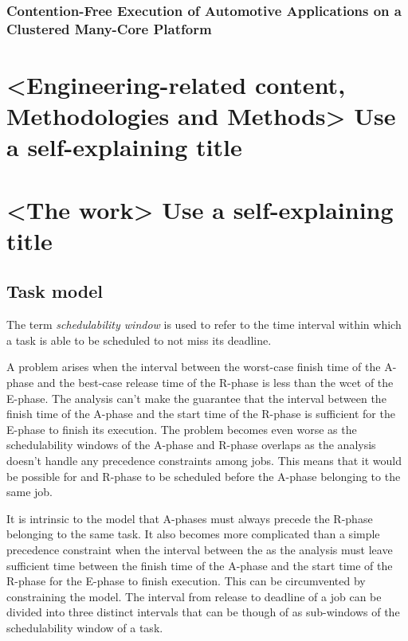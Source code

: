 \documentclass{kththesis}
\begin{document}
\subsection{Contention-Free Execution of Automotive Applications on a Clustered Many-Core Platform}



\chapter{<Engineering-related content, Methodologies and Methods> Use a self-explaining title}


\chapter{<The work> Use a self-explaining title}

\section{Task model}

The term \textit{schedulability window} is used to refer to the time interval within which a task is
able to be scheduled to not miss its deadline. 

A problem arises when the interval between the worst-case finish time of the A-phase and the
best-case release time of the R-phase is less than the \acrshort{wcet} of the E-phase. The analysis
can't make the guarantee that the interval between the finish time of the A-phase and the start time
of the R-phase is sufficient for the E-phase to finish its execution. The problem becomes even worse
as the schedulability windows of the A-phase and R-phase overlaps as the analysis doesn't handle any
precedence constraints among jobs. This means that it would be possible for and R-phase to be
scheduled before the A-phase belonging to the same job.


It is intrinsic to the model that A-phases must always precede the R-phase belonging to the same
task. It also becomes more complicated than a simple precedence constraint when the interval between
the  as the analysis must leave sufficient time between the finish time of the A-phase and the start
time of the R-phase for the E-phase to finish execution. This can be circumvented by constraining
the model. The interval from release to deadline of a job can be divided into three distinct
intervals that can be though of as sub-windows of the schedulability window of a task. 
\end{document}
